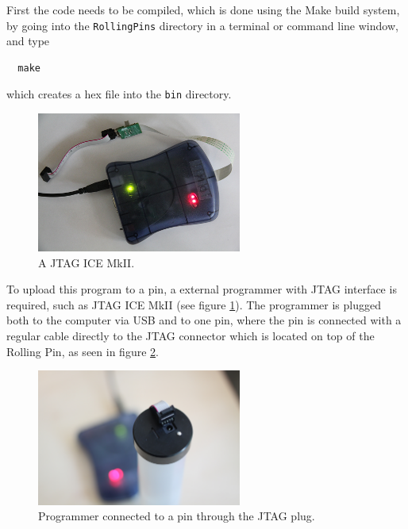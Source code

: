 \documentclass[a4paper, twoside, final]{book}%
\begin{document}
First the code needs to be compiled, which is done using the Make build system, by going into the {\tt RollingPins} directory in a terminal or command line window, and type

\begin{lstlisting}
  make
\end{lstlisting}

which creates a hex file into the {\tt bin} directory.

\begin{figure}[H]
  \centering
  \includegraphics[width=0.6\textwidth]{figures/JTAG_ICE_MkII.png}
  \caption{A JTAG ICE MkII.}
  \label{fig:JTAG_ICE_MkII}
\end{figure}

To upload this program to a pin, a external programmer with JTAG interface is required, such as JTAG ICE MkII (see figure \ref{fig:JTAG_ICE_MkII}). The programmer is plugged both to the computer via USB and to one pin, where the pin is connected with a regular cable directly to the JTAG connector which is located on top of the Rolling Pin, as seen in figure \ref{fig:JTAG_PIN}. 

\begin{figure}[H]
  \centering
  \includegraphics[width=0.6\textwidth]{figures/jtag_connector.jpg}
  \caption{Programmer connected to a pin through the JTAG plug.}
  \label{fig:JTAG_PIN}
\end{figure}
\end{document}
